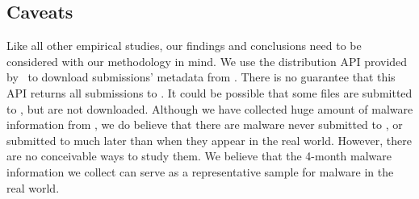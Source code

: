 \subsection{Caveats}
Like all other empirical studies, 
our findings and conclusions need to be considered with our methodology in mind. 
We use the distribution API provided by \vt\ to download submissions' metadata 
from \vt. 
There is no guarantee that this API returns all submissions to \vt.
It could be possible that some files are submitted to \vt, 
but are not downloaded. %
Although we have collected huge amount of malware information from \vt,
we do believe that there are malware never submitted to \vt, 
or submitted to \vt{} much later than when they appear in the real world. 
However, there are no conceivable ways to study them.
We believe that the 4-month malware information we collect can serve as a representative sample for malware in the real world. 